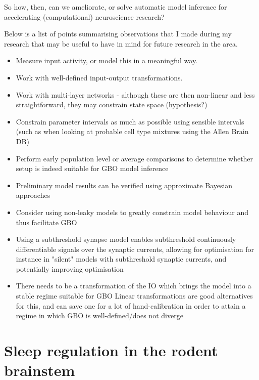 \documentclass[mphil,deptreport,ianc]{infthesis} %
\begin{document}
So how, then, can we ameliorate, or solve automatic model inference for accelerating (computational) neuroscience research?

Below is a list of points summarising observations that I made during my research that may be useful to have in mind for future research in the area.

\begin{itemize}
    \item Measure input activity, or model this in a meaningful way.
    \item Work with well-defined input-output transformations.
    \item Work with multi-layer networks - although these are then non-linear and less straightforward, they may constrain state space (hypothesis?)
    \item Constrain parameter intervals as much as possible using sensible intervals (such as when looking at probable cell type mixtures using the Allen Brain DB)
    \item Perform early population level or average comparisons to determine whether setup is indeed suitable for GBO model inference
    \item Preliminary model results can be verified using approximate Bayesian approaches
    \item Consider using non-leaky models to greatly constrain model behaviour and thus facilitate GBO
    \item Using a subthreshold synapse model enables subthreshold continuously differentiable signals over the synaptic currents, allowing for optimisation for instance in "silent" models with subthreshold synaptic currents, and potentially improving optimisation
    \item There needs to be a transformation of the IO which brings the model into a stable regime suitable for GBO
        Linear transformations are good alternatives for this, and can save one for a lot of hand-calibration in order to attain a regime in which GBO is well-defined/does not diverge
\end{itemize}


\chapter{Sleep regulation in the rodent brainstem}\label{chpt:sleep}
\end{document}
